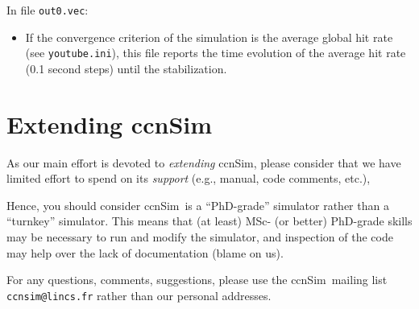 \documentclass[10pt]{article}
\newcommand{\ccnSim}[0]{ccnSim}
\begin{document}
\noindent In file \verb!out0.vec!:
\begin{itemize}
\item If the convergence criterion of the simulation is the average global hit rate (see \verb!youtube.ini!),  this file reports the time evolution of the  average hit rate (0.1 second steps) until the stabilization.	
\end{itemize}



\section{Extending \ccnSim}

As our main effort is devoted to \emph{extending} \ccnSim, please consider that we have limited effort to spend on its \emph{support} (e.g., manual, code comments, etc.), 

Hence, you should consider \ccnSim\ is a ``PhD-grade'' simulator rather than a ``turnkey'' simulator. This means that (at least) MSc- (or better) PhD-grade skills may be necessary to run and modify the simulator, and inspection of the code may help over the lack of documentation (blame on us).

For any questions, comments, suggestions, please use the \ccnSim\ mailing list  \verb!ccnsim@lincs.fr!  rather than our personal addresses.






 
\end{document}
